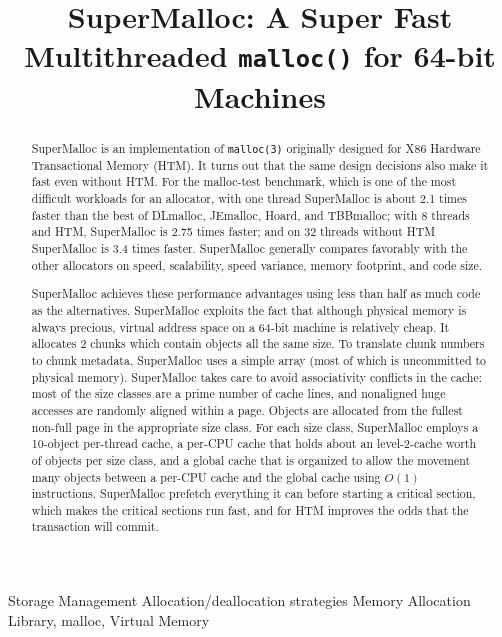 \documentclass[natbib,sort&compress]{sigplanconf}
\begin{document}
\setlength{\pdfpageheight}{\paperheight}
\setlength{\pdfpagewidth}{\paperwidth}

\title{SuperMalloc: A Super Fast Multithreaded \texttt{malloc()} for 64-bit Machines}
\date{}
\maketitle
\begin{abstract}

SuperMalloc is an implementation of \texttt{malloc(3)} originally
designed for X86 Hardware Transactional Memory (HTM)\@.  It turns out
that the same design decisions also make it fast even without HTM\@.
For the malloc-test benchmark, which is one of the most difficult
workloads for an allocator, with one thread SuperMalloc is about 2.1
times faster than the best of DLmalloc, JEmalloc, Hoard, and
TBBmalloc; with 8 threads and HTM, SuperMalloc is 2.75 times faster;
and on 32 threads without HTM SuperMalloc is 3.4 times faster.
SuperMalloc generally compares favorably with the other allocators on
speed, scalability, speed variance, memory footprint, and code size.

SuperMalloc achieves these performance advantages using less than half
as much code as the alternatives.  SuperMalloc exploits the fact that
although physical memory is always precious, virtual address space on
a 64-bit machine is relatively cheap.  It allocates
\unit{2}\mebi\byte{} chunks which contain objects all the same size.
To translate chunk numbers to chunk metadata, SuperMalloc uses a
simple array (most of which is uncommitted to physical memory).
SuperMalloc takes care to avoid associativity conflicts in the cache:
most of the size classes are a prime number of cache lines, and
nonaligned huge accesses are randomly aligned within a page.  Objects
are allocated from the fullest non-full page in the appropriate size
class.  For each size class, SuperMalloc employs a 10-object
per-thread cache, a per-CPU cache that holds about an level-2-cache
worth of objects per size class, and a global cache that is organized
to allow the movement many objects between a per-CPU cache and the
global cache using $O(1)$ instructions.  SuperMalloc prefetch
everything it can before starting a critical section, which makes the
critical sections run fast, and for HTM improves the odds that the
transaction will commit.

\end{abstract}
                {Storage Management}
                {Allocation/deallocation strategies}
\keywords{}
Memory Allocation Library, malloc, Virtual Memory
\end{document}

